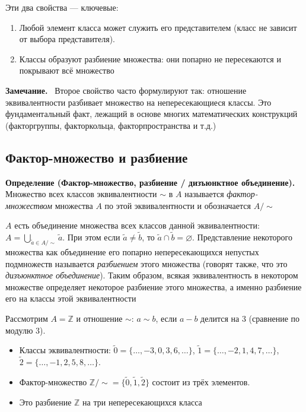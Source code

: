 \documentclass[a4paper,12pt]{article}
\newcommand{\myremark}{\textbf{Замечание.}\ }
\theoremstyle{definition}
\theoremstyle{plain}
\theoremstyle{remark}
\begin{document}
	\begin{tcolorbox}[colback=green!5, colframe=green!50!black, title=Пояснение]
		Эти два свойства — ключевые:
		\begin{enumerate}
			\item Любой элемент класса может служить его представителем (класс не зависит от выбора представителя).
			\item Классы образуют разбиение множества: они попарно не пересекаются и покрывают всё множество
		\end{enumerate}
	\end{tcolorbox}
	
	\myremark
	Второе свойство часто формулируют так: отношение эквивалентности разбивает множество на непересекающиеся классы. Это фундаментальный факт, лежащий в основе многих математических конструкций (факторгруппы, факторкольца, факторпространства и т.д.)
	
	\subsection{Фактор-множество и разбиение}
	
	\noindent \textbf{Определение (Фактор-множество, разбиение / дизъюнктное объединение).}
	Множество всех классов эквивалентности $\sim$ в $A$ называется \textit{фактор-множеством} множества $A$ по этой эквивалентности и обозначается $A/{\sim}$
	
	$A$ есть объединение множества всех классов данной эквивалентности: $A = \bigcup_{\widetilde{a} \in A/{\sim}} \widetilde{a}$. При этом если $\widetilde{a} \neq \widetilde{b}$, то $\widetilde{a} \cap \widetilde{b} = \varnothing$. Представление некоторого множества как объединение его попарно непересекающихся непустых подмножеств называется \textit{разбиением} этого множества (говорят также, что это \textit{дизъюнктное объединение}). Таким образом, всякая эквивалентность в некотором множестве определяет некоторое разбиение этого множества, а именно разбиение его на классы этой эквивалентности
	
	\begin{tcolorbox}[colback=blue!5, colframe=blue!40!black, title=Пример фактор-множества]
		Рассмотрим $A = \mathbb{Z}$ и отношение $\sim$: $a \sim b$, если $a - b$ делится на $3$ (сравнение по модулю $3$).
		\begin{itemize}
			\item Классы эквивалентности: 
			$\widetilde{0} = \{\dots, -3, 0, 3, 6, \dots\}$,
			$\widetilde{1} = \{\dots, -2, 1, 4, 7, \dots\}$,
			$\widetilde{2} = \{\dots, -1, 2, 5, 8, \dots\}$.
			\item Фактор-множество $\mathbb{Z}/{\sim} = \{\widetilde{0}, \widetilde{1}, \widetilde{2}\}$ состоит из трёх элементов.
			\item Это разбиение $\mathbb{Z}$ на три непересекающихся класса
		\end{itemize}
	\end{tcolorbox}
	
\end{document}
